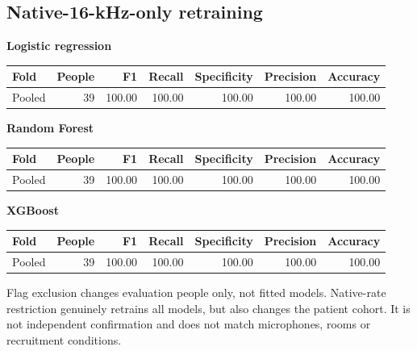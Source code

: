 \documentclass[11pt,a4paper]{article}
\begin{document}
\subsection*{Native-16-kHz-only retraining}
\textbf{Logistic regression}\begin{center}\small\begin{tabular}{lrrrrrr}\toprule Fold & People & F1 & Recall & Specificity & Precision & Accuracy\\\midrule
Pooled & 39 & 100.00 & 100.00 & 100.00 & 100.00 & 100.00\\\bottomrule\end{tabular}\end{center}
\textbf{Random Forest}\begin{center}\small\begin{tabular}{lrrrrrr}\toprule Fold & People & F1 & Recall & Specificity & Precision & Accuracy\\\midrule
Pooled & 39 & 100.00 & 100.00 & 100.00 & 100.00 & 100.00\\\bottomrule\end{tabular}\end{center}
\textbf{XGBoost}\begin{center}\small\begin{tabular}{lrrrrrr}\toprule Fold & People & F1 & Recall & Specificity & Precision & Accuracy\\\midrule
Pooled & 39 & 100.00 & 100.00 & 100.00 & 100.00 & 100.00\\\bottomrule\end{tabular}\end{center}
Flag exclusion changes evaluation people only, not fitted models. Native-rate restriction genuinely retrains all models, but also changes the patient cohort. It is not independent confirmation and does not match microphones, rooms or recruitment conditions.
\end{document}
